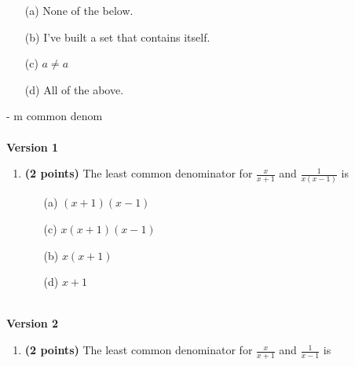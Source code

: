 \documentclass[12pt]{amsart}
\begin{document}
\begin{enumerate}[resume]
\begin{minipage}[t]{1.0\linewidth}\begin{itemize}\item[(a)]  None of the below.  \item[(b)]  I've built a set that contains itself. \item[(c)]  $a \neq a$ \item[(d)]   All of the above. \end{itemize}\end{minipage} \vfill \end{enumerate} - m common denom \\$ $ \\ {\bf Version 1} \\\begin{enumerate}[resume]
\item {\bf (2 points)} 
 The least common denominator for $\displaystyle \frac{x}{x+1}$ and $\displaystyle \frac{1}{x(x-1)}$ is \vspace{.2cm}

\begin{minipage}[t]{1.0\linewidth}\begin{multicols}{2}\begin{itemize}\item[(a)]  $(x+1)(x-1)$ \item[(c)]  $x(x+1)(x-1)$ \item[(b)]  $x(x+1)$ \item[(d)]  $x+1$ \end{itemize}\end{multicols}\end{minipage} \vfill \end{enumerate}$ $ \\ {\bf Version 2} \\\begin{enumerate}[resume]
\item {\bf (2 points)} 
 The least common denominator for $\displaystyle \frac{x}{x+1}$ and $\displaystyle \frac{1}{x-1}$ is \vspace{.2cm}


\end{enumerate}
\end{document}
